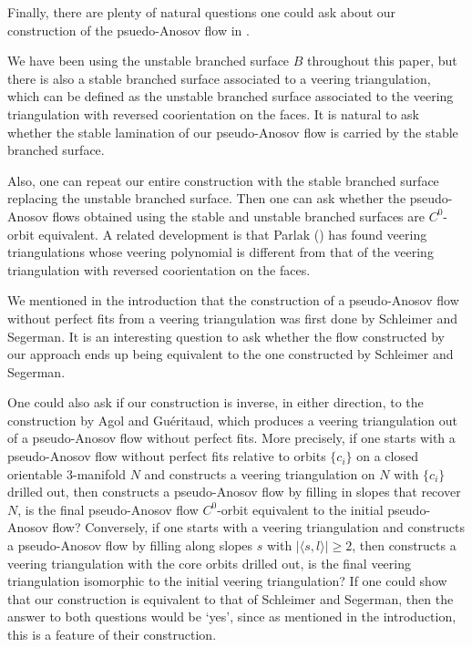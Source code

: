 \documentclass[12pt]{amsart}
\theoremstyle{definition}
\numberwithin{equation}{section}
\begin{document}
Finally, there are plenty of natural questions one could ask about our construction of the psuedo-Anosov flow in .

We have been using the unstable branched surface $B$ throughout this paper, but there is also a stable branched surface associated to a veering triangulation, which can be defined as the unstable branched surface associated to the veering triangulation with reversed coorientation on the faces. It is natural to ask whether the stable lamination of our pseudo-Anosov flow is carried by the stable branched surface. 

Also, one can repeat our entire construction with the stable branched surface replacing the unstable branched surface. Then one can ask whether the pseudo-Anosov flows obtained using the stable and unstable branched surfaces are $C^0$-orbit equivalent. A related development is that Parlak (\cite{Par21}) has found veering triangulations whose veering polynomial is different from that of the veering triangulation with reversed coorientation on the faces.

We mentioned in the introduction that the construction of a pseudo-Anosov flow without perfect fits from a veering triangulation was first done by Schleimer and Segerman. It is an interesting question to ask whether the flow constructed by our approach ends up being equivalent to the one constructed by Schleimer and Segerman.

One could also ask if our construction is inverse, in either direction, to the construction by Agol and Gu\'eritaud, which produces a veering triangulation out of a pseudo-Anosov flow without perfect fits. More precisely, if one starts with a pseudo-Anosov flow without perfect fits relative to orbits $\{c_i\}$ on a closed orientable 3-manifold $N$ and constructs a veering triangulation on $N$ with $\{c_i\}$ drilled out, then constructs a pseudo-Anosov flow by filling in slopes that recover $N$, is the final pseudo-Anosov flow $C^0$-orbit equivalent to the initial pseudo-Anosov flow? Conversely, if one starts with a veering triangulation and constructs a pseudo-Anosov flow by filling along slopes $s$ with $| \langle s,l \rangle | \geq 2$, then constructs a veering triangulation with the core orbits drilled out, is the final veering triangulation isomorphic to the initial veering triangulation? If one could show that our construction is equivalent to that of Schleimer and Segerman, then the answer to both questions would be `yes', since as mentioned in the introduction, this is a feature of their construction.



\end{document}
